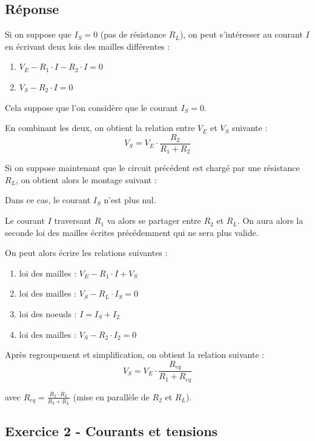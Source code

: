 \subsection*{Réponse}

Si on suppose que $I_S = 0$ (pas de résistance $R_L$), on peut s'intéresser au courant $I$ en écrivant deux lois des mailles différentes :

\begin{enumerate}
	\item $V_E - R_1 \cdot I - R_2 \cdot I = 0$
	\item $V_S - R_2 \cdot I = 0$
\end{enumerate}

Cela suppose que l'on considère que le courant $I_S = 0$.

En combinant les deux, on obtient la relation entre $V_E$ et $V_S$ suivante : $$\boxed{V_S = V_E \cdot \frac{R_2}{R_1 + R_2}}$$

\noindent\hrulefill


Si on suppose maintenant que le circuit précédent est chargé par une résistance $R_L$, on obtient alors le montage suivant :

Dans ce cas, le courant $I_S$ n'est plus nul.

Le courant $I$ traversant $R_1$ va alors se partager entre $R_2$ et $R_L$. On aura alors la seconde loi des mailles écrites précédemment qui ne sera plus valide.

On peut alors écrire les relations suivantes :
\begin{enumerate}
	\item loi des mailles : $V_E - R_1 \cdot I + V_S$ 
	\item loi des mailles : $V_S - R_L \cdot I_S = 0$  
	\item loi des noeuds : $I = I_S + I_2$ 
	\item loi des mailles : $V_S - R_2 \cdot I_2 = 0$
\end{enumerate}

Après regroupement et simplification, on obtient la relation suivante : $$\boxed{V_S = V_E \cdot \frac{R_{eq}}{R_1 + R_{eq}}}$$  

avec $R_{eq} = \frac{R_2 \cdot R_L}{R_2 + R_L}$ (mise en parallèle de $R_2$ et $R_L$).

\newpage
\subsection{Exercice 2 - Courants et tensions}


